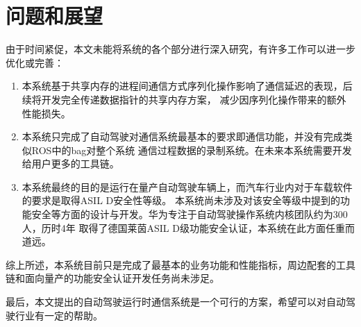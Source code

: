 \section{问题和展望}
由于时间紧促，本文未能将系统的各个部分进行深入研究，有许多工作可以进一步优化或完善：
\begin{enumerate}
    \item 本系统基于共享内存的进程间通信方式序列化操作影响了通信延迟的表现，后续将开发完全传递数据指针的共享内存方案，
    减少因序列化操作带来的额外性能损失。
    \item 本系统只完成了自动驾驶对通信系统最基本的要求即通信功能，并没有完成类似ROS中的bag对整个系统
    通信过程数据的录制系统。在未来本系统需要开发给用户更多的工具链。
    \item 本系统最终的目的是运行在量产自动驾驶车辆上，而汽车行业内对于车载软件的要求是取得ASIL D安全性等级。
    本系统尚未涉及对该安全等级中提到的功能安全等方面的设计与开发。华为专注于自动驾驶操作系统内核团队约为300人，历时4年
    取得了德国莱茵ASIL D级功能安全认证，本系统在此方面任重而道远。
\end{enumerate}

综上所述，本系统目前只是完成了最基本的业务功能和性能指标，周边配套的工具链和面向量产的功能安全认证开发任务尚未涉足。

最后，本文提出的自动驾驶运行时通信系统是一个可行的方案，希望可以对自动驾驶行业有一定的帮助。


